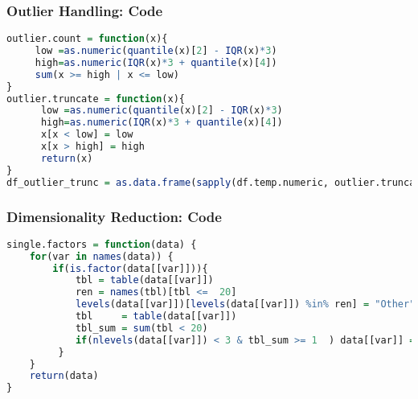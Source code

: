 \begin{frame}[fragile]
\frametitle{Outlier Handling: Code}

\begin{lstlisting}[language=R]
outlier.count = function(x){
     low =as.numeric(quantile(x)[2] - IQR(x)*3)
     high=as.numeric(IQR(x)*3 + quantile(x)[4])
     sum(x >= high | x <= low)
}
outlier.truncate = function(x){
      low =as.numeric(quantile(x)[2] - IQR(x)*3)
      high=as.numeric(IQR(x)*3 + quantile(x)[4])
      x[x < low] = low
      x[x > high] = high
      return(x)
}
df_outlier_trunc = as.data.frame(sapply(df.temp.numeric, outlier.truncate))

\end{lstlisting}

\end{frame}


\begin{frame}[fragile]
\frametitle{Dimensionality Reduction: Code}

\begin{lstlisting}[language=R]
single.factors = function(data) {
    for(var in names(data)) {
        if(is.factor(data[[var]])){
            tbl = table(data[[var]])
            ren = names(tbl)[tbl <=  20]
            levels(data[[var]])[levels(data[[var]]) %in% ren] = "Other"
            tbl     = table(data[[var]])
            tbl_sum = sum(tbl < 20) 
            if(nlevels(data[[var]]) < 3 & tbl_sum >= 1  ) data[[var]] = NA
         }
    }
    return(data)
}
\end{lstlisting}

\end{frame}

